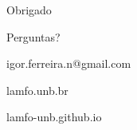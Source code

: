 \documentclass{beamer}
\begin{document}
 \begin{frame}{Obrigado}

    
    \begin{center}
    
    \Huge{Perguntas?}
    
    \vspace{.75cm}
    
    \normalsize
    
    
    
    igor.ferreira.n@gmail.com
    
    \vspace{.25cm}
    
    lamfo.unb.br
    
    \vspace{.25cm}
    
    lamfo-unb.github.io
    
        
    \end{center}

\end{frame}




\begin{frame}[allowframebreaks]%
    {\tiny
    
    }
\end{frame}
\end{document}
